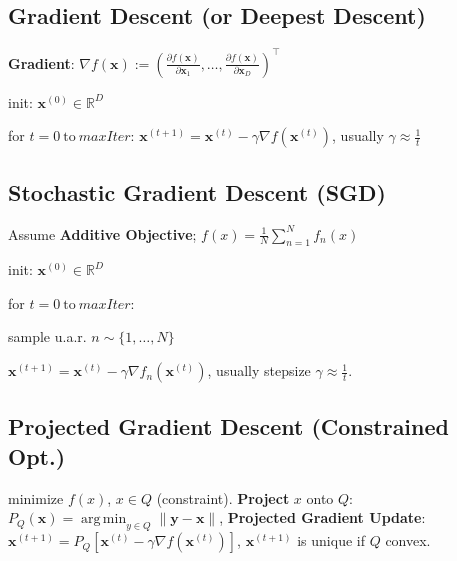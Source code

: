 \documentclass[a4paper, 11pt, landscape]{article}
\newenvironment{inlinelist}%
{\begin{enumerate*}[label=\textbf{\color{red}\theenumi.}]}%
{\end{enumerate*}}
\DeclareMathOperator*{\argmin}{arg\,min}
\begin{document}
\begin{multicols*}{3}
\subsection{Gradient Descent (or Deepest Descent)}
\textbf{Gradient}: $\nabla f(\mathbf{x}) := \left( \frac{\partial f(\mathbf{x})}{\partial \mathbf{x}_1}, \ldots, \frac{\partial f(\mathbf{x})}{\partial \mathbf{x}_D} \right)^\top$
\begin{inlinelist}
	\item init: $\mathbf{x}^{(0)} \in \mathbb{R}^D$
	\item for $t = 0 \ \text{to} \ \mathit{maxIter}$: $\mathbf{x}^{(t+1)} = \mathbf{x}^{(t)} - \gamma \nabla f(\mathbf{x}^{(t)})$, usually $\gamma \approx \frac{1}{t}$
\end{inlinelist}

\subsection{Stochastic Gradient Descent (SGD)}
Assume \textbf{Additive Objective}; $f(x) = \frac{1}{N}\sum_{n=1}^{N}f_n(x)$
\begin{inlinelist}
	\item init: $\mathbf{x}^{(0)} \in \mathbb{R}^D$
	\item for $t = 0 \ \text{to} \ \mathit{maxIter}$:
	\item sample u.a.r. $n \sim \{1, \ldots, N\}$
	\item $\mathbf{x}^{(t+1)} = \mathbf{x}^{(t)} - \gamma \nabla f_n(\mathbf{x}^{(t)})$, usually stepsize $\gamma \approx \frac{1}{t}$. 
\end{inlinelist}

\subsection{Projected Gradient Descent (Constrained Opt.)}
minimize $f(x)$, $x \in Q$ (constraint).
\textbf{Project} $x$ onto $Q$: $P_Q(\mathbf{x}) = \argmin_{y \in Q} \|\mathbf{y} - \mathbf{x}\|$,
\textbf{Projected Gradient Update}: $\mathbf{x}^{(t+1)} = P_Q[\mathbf{x}^{(t)} - \gamma \nabla f(\mathbf{x}^{(t)})]$,
$\mathbf{x}^{(t+1)}$ is unique if $Q$ convex.


\end{multicols*}
\end{document}
